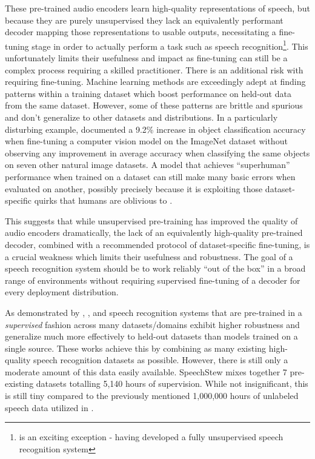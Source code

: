 These pre-trained audio encoders learn high-quality representations of speech, but because they are purely unsupervised they lack an equivalently performant decoder mapping those representations to usable outputs, necessitating a fine-tuning stage in order to actually perform a task such as speech recognition\footnote{\citet{baevski2021unsupervised} is an exciting exception - having developed a fully unsupervised speech recognition system}. This unfortunately limits their usefulness and impact as fine-tuning can still be a complex process requiring a skilled practitioner. There is an additional risk with requiring fine-tuning. Machine learning methods are exceedingly adept at finding patterns within a training dataset which boost performance on held-out data from the same dataset. However, some of these patterns are brittle and spurious and don't generalize to other datasets and distributions. In a particularly disturbing example, \citet{radford2021clip} documented a 9.2\% increase in object classification accuracy when fine-tuning a computer vision model on the ImageNet dataset \cite{russakovsky2015imagenet} without observing any improvement in average accuracy when classifying the same objects on seven other natural image datasets. A model that achieves ``superhuman'' performance when trained on a dataset can still make many basic errors when evaluated on another, possibly precisely because it is exploiting those dataset-specific quirks that humans are oblivious to \cite{geirhos2020shortcut}.

This suggests that while unsupervised pre-training has improved the quality of audio encoders dramatically, the lack of an equivalently high-quality pre-trained decoder, combined with a recommended protocol of dataset-specific fine-tuning, is a crucial weakness which limits their usefulness and robustness. The goal of a speech recognition system should be to work reliably ``out of the box'' in a broad range of environments without requiring supervised fine-tuning of a decoder for every deployment distribution.

As demonstrated by \citet{narayanan2018toward}, \citet{likhomanenko2020rethinking}, and \citet{chan2021speechstew} speech recognition systems that are pre-trained in a \textit{supervised} fashion across many datasets/domains exhibit higher robustness and generalize much more effectively to held-out datasets than models trained on a single source. These works achieve this by combining as many existing high-quality speech recognition datasets as possible. However, there is still only a moderate amount of this data easily available. SpeechStew \cite{chan2021speechstew} mixes together 7 pre-existing datasets totalling 5,140 hours of supervision. While not insignificant, this is still tiny compared to the previously mentioned 1,000,000 hours of unlabeled speech data utilized in \citet{zhang2021bigssl}.

